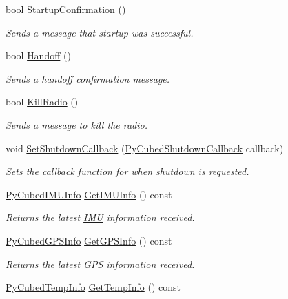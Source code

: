 \begin{DoxyCompactItemize}
bool \hyperlink{classcubesat_1_1PyCubed_afa1170644bf62745e36fcf6a479bbbee}{Startup\+Confirmation} ()
\begin{DoxyCompactList}\small\item\em Sends a message that startup was successful. \end{DoxyCompactList}\item 
bool \hyperlink{classcubesat_1_1PyCubed_a0c707ebefe9fd00e2d1e602209c1e5a6}{Handoff} ()
\begin{DoxyCompactList}\small\item\em Sends a handoff confirmation message. \end{DoxyCompactList}\item 
bool \hyperlink{classcubesat_1_1PyCubed_a1156a3504ba2c8ad1f7b6622ff9f286c}{Kill\+Radio} ()
\begin{DoxyCompactList}\small\item\em Sends a message to kill the radio. \end{DoxyCompactList}\item 
void \hyperlink{classcubesat_1_1PyCubed_acfbc0579ac92c5ef15ccf27f78bbd721}{Set\+Shutdown\+Callback} (\hyperlink{namespacecubesat_abcc8eedef699fb7e3f433200cc25e181}{Py\+Cubed\+Shutdown\+Callback} callback)
\begin{DoxyCompactList}\small\item\em Sets the callback function for when shutdown is requested. \end{DoxyCompactList}\item 
\hyperlink{structcubesat_1_1PyCubedIMUInfo}{Py\+Cubed\+I\+M\+U\+Info} \hyperlink{classcubesat_1_1PyCubed_a74fd4657765351e136367592db3e3445}{Get\+I\+M\+U\+Info} () const
\begin{DoxyCompactList}\small\item\em Returns the latest \hyperlink{classcubesat_1_1IMU}{I\+MU} information received. \end{DoxyCompactList}\item 
\hyperlink{structcubesat_1_1PyCubedGPSInfo}{Py\+Cubed\+G\+P\+S\+Info} \hyperlink{classcubesat_1_1PyCubed_a9590d2e77b63e536062209b91a393d22}{Get\+G\+P\+S\+Info} () const
\begin{DoxyCompactList}\small\item\em Returns the latest \hyperlink{classcubesat_1_1GPS}{G\+PS} information received. \end{DoxyCompactList}\item 
\hyperlink{structcubesat_1_1PyCubedTempInfo}{Py\+Cubed\+Temp\+Info} \hyperlink{classcubesat_1_1PyCubed_a1eb8a72d0782680b320a336a301927a4}{Get\+Temp\+Info} () const

\end{DoxyCompactItemize}
